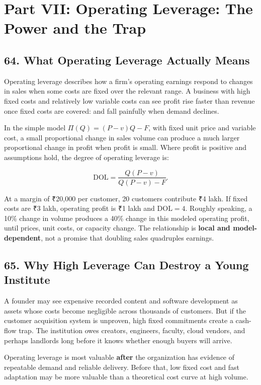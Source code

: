 \section*{Part VII: Operating Leverage: The Power and the Trap}

\subsection*{64. What Operating Leverage Actually Means}

Operating leverage describes how a firm's operating earnings respond to changes in sales when some costs are fixed over the relevant range. A business with high fixed costs and relatively low variable costs can see profit rise faster than revenue once fixed costs are covered: and fall painfully when demand declines.

In the simple model $\Pi(Q)=(P-v)Q-F$, with fixed unit price and variable cost, a small proportional change in sales volume can produce a much larger proportional change in profit when profit is small. Where profit is positive and assumptions hold, the degree of operating leverage is:

\begin{equation}
\mathrm{DOL} = \frac{Q(P-v)}{Q(P-v)-F}.
\end{equation}

At a margin of ₹20,000 per customer, 20 customers contribute ₹4 lakh. If fixed costs are ₹3 lakh, operating profit is ₹1 lakh and $\mathrm{DOL}=4$. Roughly speaking, a 10\% change in volume produces a 40\% change in this modeled operating profit, until prices, unit costs, or capacity change. The relationship is \textbf{local and model-dependent}, not a promise that doubling sales quadruples earnings.

\subsection*{65. Why High Leverage Can Destroy a Young Institute}

A founder may see expensive recorded content and software development as assets whose costs become negligible across thousands of customers. But if the customer acquisition system is unproven, high fixed commitments create a cash-flow trap. The institution owes creators, engineers, faculty, cloud vendors, and perhaps landlords long before it knows whether enough buyers will arrive.

Operating leverage is most valuable \textbf{after} the organization has evidence of repeatable demand and reliable delivery. Before that, low fixed cost and fast adaptation may be more valuable than a theoretical cost curve at high volume.

